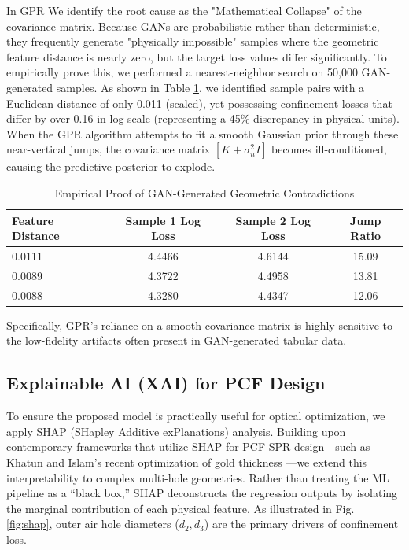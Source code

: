 \documentclass[conference]{IEEEtran}
\begin{document}
In GPR We identify the root cause as the "Mathematical Collapse" of the covariance matrix. Because GANs are probabilistic rather than deterministic, they frequently generate "physically impossible" samples where the geometric feature distance is nearly zero, but the target loss values differ significantly. To empirically prove this, we performed a nearest-neighbor search on 50,000 GAN-generated samples. As shown in Table \ref{tab:gan_fail}, we identified sample pairs with a Euclidean distance of only 0.011 (scaled), yet possessing confinement losses that differ by over 0.16 in log-scale (representing a 45\% discrepancy in physical units). When the GPR algorithm attempts to fit a smooth Gaussian prior through these near-vertical jumps, the covariance matrix $[K + \sigma_n^2 I]$ becomes ill-conditioned, causing the predictive posterior to explode.

\begin{table}[htbp]
\caption{Empirical Proof of GAN-Generated Geometric Contradictions}
\begin{center}
\begin{tabular}{lccc}
\toprule
\textbf{Feature Distance} & \textbf{Sample 1 Log Loss} & \textbf{Sample 2 Log Loss} & \textbf{Jump Ratio} \\
\midrule
0.0111 & 4.4466 & 4.6144 & 15.09 \\
0.0089 & 4.3722 & 4.4958 & 13.81 \\
0.0088 & 4.3280 & 4.4347 & 12.06 \\
\bottomrule
\end{tabular}
\label{tab:gan_fail}
\end{center}
\end{table}

Specifically, GPR's reliance on a smooth covariance matrix is highly sensitive to the low-fidelity artifacts often present in GAN-generated tabular data.

\subsection{Explainable AI (XAI) for PCF Design}
To ensure the proposed model is practically useful for optical optimization, we apply SHAP (SHapley Additive exPlanations) analysis. Building upon contemporary frameworks that utilize SHAP for PCF-SPR design---such as Khatun and Islam's recent optimization of gold thickness \cite{b3}---we extend this interpretability to complex multi-hole geometries. Rather than treating the ML pipeline as a ``black box,'' SHAP deconstructs the regression outputs by isolating the marginal contribution of each physical feature. As illustrated in Fig. \ref{fig:shap}, outer air hole diameters ($d_2, d_3$) are the primary drivers of confinement loss. 
\end{document}
